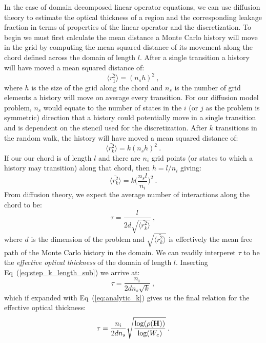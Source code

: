 \documentclass[letterpaper,12pt]{article}
\begin{document}
In the case of domain decomposed linear operator equations, we can use
diffusion theory to estimate the optical thickness of a region and the
corresponding leakage fraction in terms of properties of the linear
operator and the discretization. To begin we must first calculate the
mean distance a Monte Carlo history will move in the grid by computing
the mean squared distance of its movement along the chord defined
across the domain of length $l$. After a single transition a history
will have moved a mean squared distance of:
\begin{equation}
  \langle \bar{r_1^2} \rangle = (n_s h)^2\:,
  \label{eq:step_1_length}
\end{equation}
where $h$ is the size of the grid along the chord and $n_s$ is the
number of grid elements a history will move on average every
transition. For our diffusion model problem, $n_s$ would equate to the
number of states in the $i$ (or $j$ as the problem is symmetric)
direction that a history could potentially move in a single transition
and is dependent on the stencil used for the discretization. After $k$
transitions in the random walk, the history will have moved a mean
squared distance of:
\begin{equation}
  \langle \bar{r_k^2} \rangle = k (n_s h)^2\:.
  \label{eq:step_k_length}
\end{equation}
If our our chord is of length $l$ and there are $n_i$ grid points (or
states to which a history may transition) along that chord, then $h =
l / n_i$ giving:
\begin{equation}
  \langle \bar{r_k^2} \rangle = k \Bigg(\frac{n_s l}{n_i}\Bigg)^2\:.
  \label{eq:step_k_length_sub}
\end{equation}
From diffusion theory, we expect the average number of interactions
along the chord to be:
\begin{equation}
  \tau = \frac{l}{2 d \sqrt{\langle \bar{r_k^2} \rangle}}\:,
  \label{eq:optical_thickness_1}
\end{equation}
where $d$ is the dimension of the problem and $\sqrt{\langle
  \bar{r_k^2} \rangle}$ is effectively the mean free path of the Monte
Carlo history in the domain. We can readily interperet $\tau$ to be
the \textit{effective optical thickness} of the domain of length
$l$. Inserting Eq~(\ref{eq:step_k_length_sub}) we arrive at:
\begin{equation}
  \tau = \frac{n_i}{2 d n_s \sqrt{k}}\:,
  \label{eq:optical_thickness_2}
\end{equation}
which if expanded with Eq~(\ref{eq:analytic_k}) gives us the final
relation for the effective optical thickness:
\begin{equation}
  \tau = \frac{n_i}{2 d n_s}
  \sqrt{\frac{\log(\rho(\mathbf{H}))}{\log(W_c)}}\:.
  \label{eq:optical_thickness_3}
\end{equation}
\end{document}
